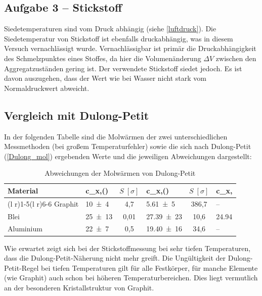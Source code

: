 \subsection{Aufgabe 3 -- Stickstoff}
Siedetemperaturen sind vom Druck abhängig (siehe \cref{luftdruck}). Die Siedetemperatur von Stickstoff ist ebenfalls druckabhängig, was in diesem Versuch vernachlässigt wurde. Vernachlässigbar ist primär die Druckabhängigkeit des Schmelzpunktes eines Stoffes, da hier die Volumenänderung \(\Delta V\) zwischen den Aggregatzuständen gering ist. Der verwendete Stickstoff siedet jedoch. Es ist davon auszugehen, dass der Wert wie bei Wasser nicht stark vom Normaldruckwert abweicht.

\subsection{Vergleich mit Dulong-Petit}
In der folgenden Tabelle sind die Molwärmen der zwei unterschiedlichen Messmethoden (bei großem Temperaturfehler) sowie die sich nach Dulong-Petit (\cref{Dulong_mol}) ergebenden Werte und die jeweiligen Abweichungen dargestellt:

\begin{table}[htbp]
\centering
\caption{Abweichungen der Molwärmen von Dulong-Petit}
\begin{tabularx}{\textwidth}{lZS[table-format=1.2]ZS[table-format=3.1]x}
\toprule
Material & {c_{x,}() \;[\unit{\J\per\g\per\K}]} & {\(S\;[\sigma]\)} & {c_{x,}() \;[\unit{\J\per\g\per\K}]} & {\(S\;[\sigma]\)} & {c_{x,} \;[\unit{\J\per\g\per\K}]} \\
\cmidrule(l r){1-5}\cmidrule(l r){6-6}
Graphit   & \num{10(4)}  & 4,7  & \num{5,61(5)}   & 386,7 & {--} \\
Blei      & \num{25(13)} & 0,01 & \num{27,39(23)}  & 10,6  & \num{24,94} \\
Aluminium & \num{22(7)}  & 0,5  & \num{19,40(16)}  & 34,6  & {--} \\
\bottomrule
\end{tabularx}
\label{table:vergleich_alles}
\end{table}
\FloatBarrier

Wie erwartet zeigt sich bei der Stickstoffmessung bei sehr tiefen Temperaturen, dass die Dulong-Petit-Näherung nicht mehr greift. Die Ungültigkeit der Dulong-Petit-Regel bei tiefen Temperaturen gilt für alle Festkörper, für manche Elemente (wie Graphit) auch schon bei höheren Temperaturbereichen. Dies liegt vermutlich an der besonderen Kristallstruktur von Graphit.

